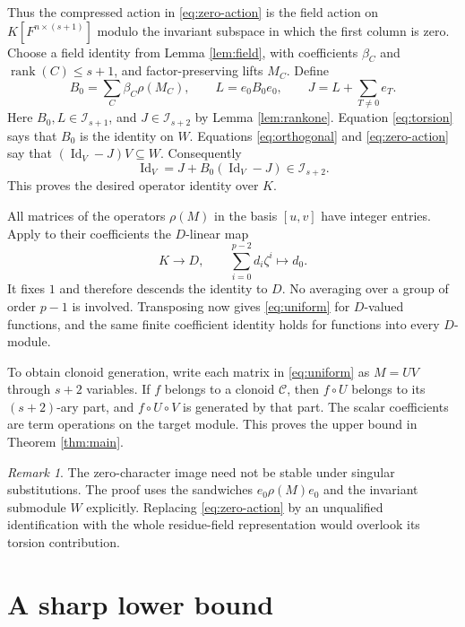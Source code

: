 \documentclass[11pt]{article}
\theoremstyle{remark}\newtheorem{remark}[theorem]{Remark}
\newcommand{\rk}{\operatorname{rank}}
\newcommand{\Id}{\operatorname{Id}}
\begin{document}
Thus the compressed action in \eqref{eq:zero-action} is the field action on
$K[F^{n\times(s+1)}]$ modulo the invariant subspace in which the first column is zero. Choose a field identity from Lemma \ref{lem:field}, with coefficients $\beta_C$ and $\rk(C)\le s+1$, and factor-preserving lifts $M_C$. Define
\begin{equation}\label{eq:B-L-J}
 B_0=\sum_C\beta_C\rho(M_C),\qquad
 L=e_0B_0e_0,\qquad J=L+\sum_{T\ne0}e_T.
\end{equation}
Here $B_0,L\in\mathcal I_{s+1}$, and $J\in\mathcal I_{s+2}$ by Lemma \ref{lem:rankone}. Equation \eqref{eq:torsion} says that $B_0$ is the identity on $W$. Equations \eqref{eq:orthogonal} and \eqref{eq:zero-action} say that $(\Id_V-J)V\subseteq W$. Consequently
\begin{equation}\label{eq:correction}
 \Id_V=J+B_0(\Id_V-J)\in\mathcal I_{s+2}.
\end{equation}
This proves the desired operator identity over $K$.

All matrices of the operators $\rho(M)$ in the basis $[u,v]$ have integer entries. Apply to their coefficients the $D$-linear map
\[
 K\longrightarrow D,\qquad
 \sum_{i=0}^{p-2}d_i\zeta^i\longmapsto d_0.
\]
It fixes $1$ and therefore descends the identity to $D$. No averaging over a group of order $p-1$ is involved. Transposing now gives \eqref{eq:uniform} for $D$-valued functions, and the same finite coefficient identity holds for functions into every $D$-module.

To obtain clonoid generation, write each matrix in \eqref{eq:uniform} as $M=UV$ through $s+2$ variables. If $f$ belongs to a clonoid $\mathcal C$, then $f\circ U$ belongs to its $(s+2)$-ary part, and $f\circ U\circ V$ is generated by that part. The scalar coefficients are term operations on the target module. This proves the upper bound in Theorem \ref{thm:main}.

\begin{remark}
The zero-character image need not be stable under singular substitutions. The proof uses the sandwiches $e_0\rho(M)e_0$ and the invariant submodule $W$ explicitly. Replacing \eqref{eq:zero-action} by an unqualified identification with the whole residue-field representation would overlook its torsion contribution.
\end{remark}

\section{A sharp lower bound}
\end{document}
